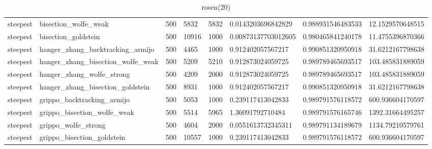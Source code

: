 \documentclass[a4paper,11pt]{article}
\numberwithin{equation}{section} %
\begin{document}
\begin{table}[h!]
{\begin{tabular}{|l|l|l|l|l|l|l|l|}
        steepest & bisection\_wolfe\_weak & 500 & 5832 & 5832 & 0.0143203696842829 & 0.988931546483533 & 12.1529570648515 \\
        steepest & bisection\_goldstein & 500 & 10916 & 1000 & 0.00873137703012605 & 0.980465841240178 & 11.4755396870366 \\
        steepest & hanger\_zhang\_backtracking\_armijo & 500 & 4465 & 1000 & 0.912402057567217 & 0.990851320950918 & 31.6212167798638 \\
        steepest & hanger\_zhang\_bisection\_wolfe\_weak & 500 & 5209 & 5210 & 0.912873024059725 & 0.989789465693517 & 103.485831889059 \\
        steepest & hanger\_zhang\_wolfe\_strong & 500 & 4209 & 2000 & 0.912873024059725 & 0.989789465693517 & 103.485831889059 \\
        steepest & hanger\_zhang\_bisection\_goldstein & 500 & 8931 & 1000 & 0.912402057567217 & 0.990851320950918 & 31.6212167798638 \\
        steepest & grippo\_backtracking\_armijo & 500 & 5053 & 1000 & 0.239117413042833 & 0.989791576118572 & 600.936604170597 \\
        steepest & grippo\_bisection\_wolfe\_weak & 500 & 5514 & 5965 & 1.36091792710484 & 0.989791576165746 & 1392.31664495257 \\
        steepest & grippo\_wolfe\_strong & 500 & 4604 & 2000 & 0.0551613732345311 & 0.989791134189679 & 1134.79210579761 \\
        steepest & grippo\_bisection\_goldstein & 500 & 10557 & 1000 & 0.239117413042833 & 0.989791576118572 & 600.936604170597 \\
\end{tabular}}
\caption{rosen(20)}
\label{table:rosen(20)}
\end{table}
\end{document}
